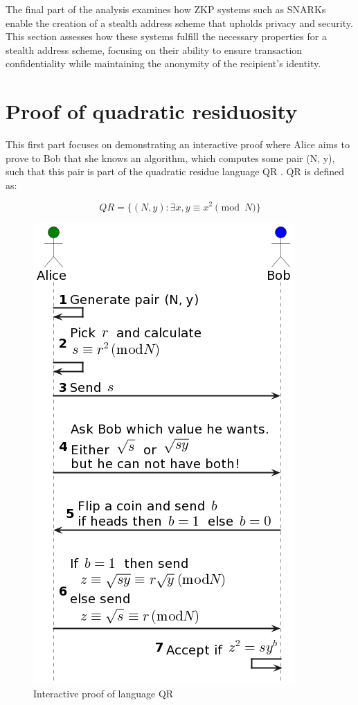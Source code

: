 The final part of the analysis examines how ZKP systems such as SNARKs enable
the creation of a stealth address scheme that upholds privacy and security.
This section assesses how these systems fulfill the necessary properties for a
stealth address scheme, focusing on their ability to ensure transaction
confidentiality while maintaining the anonymity of the recipient's identity.

\section{Proof of quadratic residuosity}

This first part focuses on demonstrating an interactive proof where Alice aims
to prove to Bob that she knows an algorithm, which computes some pair (N, y),
such that this pair is part of the quadratic residue language QR \cite{Goldwasser1989}.
QR is defined as:

\[QR = \lbrace(N, y): \exists x, y \equiv x^2 \pmod{N}\rbrace\]

\begin{figure}[h!]
    \centering
    \includegraphics[scale=0.6]{assets/images/qr_ip.png}
    \caption{Interactive proof of language QR}
    \label{fig:qr_ip}
    \vspace{0.5cm}
\end{figure}

